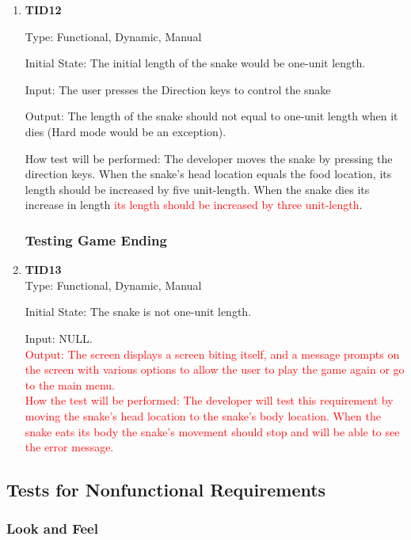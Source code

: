 \documentclass[12pt, titlepage]{article}
\begin{document}
\begin{enumerate}
\item{\textbf{TID12}\\}

Type: Functional, Dynamic, Manual 	
					
Initial State: The initial length of the snake would be one-unit length.
				
Input: The user presses the Direction keys to control the snake

Output: The length of the snake should not equal to one-unit length when it dies (Hard mode would be an exception).
					
How test will be performed: The developer moves the snake by pressing the direction keys. When the snake's head location equals the food location, its length should be increased by five unit-length. When the snake dies its increase in length      \textcolor{red}{its length should be increased by three unit-length}.


\subsubsection{Testing Game Ending}
\item{\textbf{TID13}\\}
Type: Functional, Dynamic, Manual 	
					
Initial State: The snake is not one-unit length.
				
Input: NULL.\\
\textcolor{red}{Output: The screen displays a screen biting itself, and a message prompts on the screen with various options to allow the user to play the game again or go to the main menu.\\
How the test will be performed: The developer will test this requirement by moving the snake’s head location to the snake’s body location. When the snake eats its body the snake’s movement should stop and will be able to see the error message.}
\end{enumerate}


\subsection{Tests for Nonfunctional Requirements}

\subsubsection{Look and Feel}
\end{document}
